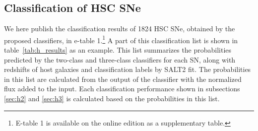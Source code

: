 \documentclass[proof]{pasj01}
\begin{document}
%
\subsection{Classification of HSC SNe}
%
We here publish the classification results of 1824 HSC SNe, obtained by the proposed classifiers, in e-table 1.\footnote{ E-table 1 is available on the online edition as a supplementary table. }
A part of this classification list is shown in table\ \ref{tab:h_results} as an example.
This list summarizes the probabilities predicted by the two-class and three-class classifiers for each SN, along with redshifts of host galaxies and classification labels by SALT2 fit.
The probabilities in this list are calculated from the output of the classifier with the normalized flux added to the input.
Each classification performance shown in subsections \ref{sec:h2} and \ref{sec:h3} is calculated based on the probabilities in this list.
\end{document}
